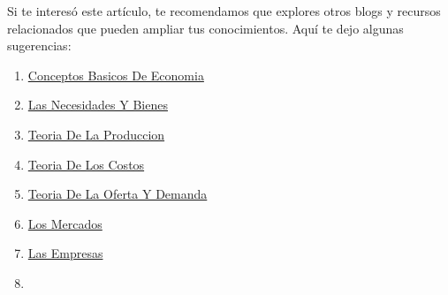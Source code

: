 \documentclass[
  jou,
  floatsintext,
  longtable,
  a4paper,
  nolmodern,
  notxfonts,
  notimes,
  12pt,
  colorlinks=true,linkcolor=blue,citecolor=blue,urlcolor=blue]{apa7}
\providecommand{\tightlist}{%
  \setlength{\itemsep}{0pt}\setlength{\parskip}{0pt}}
\begin{document}
Si te interesó este artículo, te recomendamos que explores otros blogs y
recursos relacionados que pueden ampliar tus conocimientos. Aquí te dejo
algunas sugerencias:

\begin{enumerate}
\def\labelenumi{\arabic{enumi}.}
\tightlist
\item
  \href{https://achalmaedison.netlify.app/economia-preuniversitaria/2014-01-01-conceptos-basicos-de-economia/index.pdf}{}
  \href{https://achalmaedison.netlify.app/economia-preuniversitaria/2014-01-01-conceptos-basicos-de-economia}{Conceptos
  Basicos De Economia}
\item
  \href{https://achalmaedison.netlify.app/economia-preuniversitaria/2014-01-07-las-necesidades-y-bienes/index.pdf}{}
  \href{https://achalmaedison.netlify.app/economia-preuniversitaria/2014-01-07-las-necesidades-y-bienes}{Las
  Necesidades Y Bienes}
\item
  \href{https://achalmaedison.netlify.app/economia-preuniversitaria/2014-01-14-teoria-de-la-produccion/index.pdf}{}
  \href{https://achalmaedison.netlify.app/economia-preuniversitaria/2014-01-14-teoria-de-la-produccion}{Teoria
  De La Produccion}
\item
  \href{https://achalmaedison.netlify.app/economia-preuniversitaria/2014-01-21-teoria-de-los-costos/index.pdf}{}
  \href{https://achalmaedison.netlify.app/economia-preuniversitaria/2014-01-21-teoria-de-los-costos}{Teoria
  De Los Costos}
\item
  \href{https://achalmaedison.netlify.app/economia-preuniversitaria/2014-01-28-teoria-de-la-oferta-y-demanda/index.pdf}{}
  \href{https://achalmaedison.netlify.app/economia-preuniversitaria/2014-01-28-teoria-de-la-oferta-y-demanda}{Teoria
  De La Oferta Y Demanda}
\item
  \href{https://achalmaedison.netlify.app/economia-preuniversitaria/2014-02-04-los-mercados/index.pdf}{}
  \href{https://achalmaedison.netlify.app/economia-preuniversitaria/2014-02-04-los-mercados}{Los
  Mercados}
\item
  \href{https://achalmaedison.netlify.app/economia-preuniversitaria/2014-02-11-las-empresas/index.pdf}{}
  \href{https://achalmaedison.netlify.app/economia-preuniversitaria/2014-02-11-las-empresas}{Las
  Empresas}
\item
  \href{https://achalmaedison.netlify.app/economia-preuniversitaria/2014-02-18-sistema-financiero/index.pdf}{}

\end{enumerate}
\end{document}
